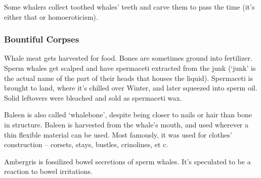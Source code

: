 \begin{multicols}{2}
Some whalers collect toothed whales' teeth and carve them to pass the time (it's either that or homoeroticism).

\subsubsection{Bountiful Corpses}

Whale meat gets harvested for food.
Bones are sometimes ground into fertilizer.
Sperm whales get scalped and have spermaceti extracted from the junk
(`junk' is the actual name of the part of their heads that houses the liquid).
Spermaceti is brought to land, where it's chilled over Winter, and later squeezed into sperm oil.
Solid leftovers were bleached and sold as spermaceti wax.

Baleen is also called `whalebone', despite being closer to nails or hair than bone in structure.
Baleen is harvested from the whale's mouth, and used wherever a thin flexible material can be used.
Most famously, it was used for clothes' construction -- corsets, stays, bustles, crinolines, et c.

Ambergris is fossilized bowel secretions of sperm whales.
It's speculated to be a reaction to bowel irritations.

\end{multicols}

\clearpage


